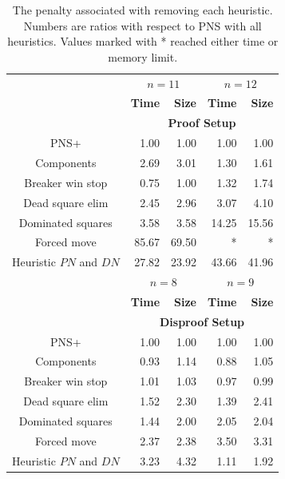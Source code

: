 \documentclass[conference]{IEEEtran}
\theoremstyle{definition}
\newcommand{\pn}{$PN$\xspace}
\newcommand{\dn}{$DN$\xspace}
\begin{document}
\begin{table}[htbp]
\caption{The penalty associated with removing each heuristic. Numbers are ratios with respect to PNS with all heuristics. Values marked with * reached either time or memory limit.}
\begin{center}
\begin{tabular}{ c | r r | r r }
\hline
& \multicolumn{2}{c}{$n=11$} & \multicolumn{2}{c}{$n=12$} \\
& \textbf{Time} & \textbf{Size} & \textbf{Time} & \textbf{Size}\\
\hline 
& \multicolumn{4}{c}{\bf {Proof Setup}} \\
PNS+ & 1.00 & 1.00  & 1.00 & 1.00  \\
Components & 2.69 & 3.01  & 1.30 & 1.61  \\
Breaker win stop & 0.75 & 1.00  & 1.32 & 1.74  \\
Dead square elim & 2.45 & 2.96  & 3.07 & 4.10  \\
Dominated squares & 3.58 & 3.58  & 14.25 & 15.56  \\
Forced move & 85.67 & 69.50  & * & *  \\
Heuristic \pn and \dn & 27.82 & 23.92  & 43.66 & 41.96  \\



\hline 
& \multicolumn{2}{c}{$n=8$} & \multicolumn{2}{c}{$n=9$} \\
& \textbf{Time} & \textbf{Size} & \textbf{Time} & \textbf{Size}\\
\hline 

& \multicolumn{4}{c}{\bf {Disproof Setup}} \\
PNS+ & 1.00 & 1.00  & 1.00 & 1.00  \\
Components & 0.93 & 1.14  & 0.88 & 1.05  \\
Breaker win stop & 1.01 & 1.03  & 0.97 & 0.99  \\
Dead square elim & 1.52 & 2.30  & 1.39 & 2.41  \\
Dominated squares & 1.44 & 2.00  & 2.05 & 2.04  \\
Forced move & 2.37 & 2.38  & 3.50 & 3.31  \\
Heuristic \pn and \dn & 3.23 & 4.32  & 1.11 & 1.92  \\


\end{tabular}
\end{center}
\end{table}
\end{document}
